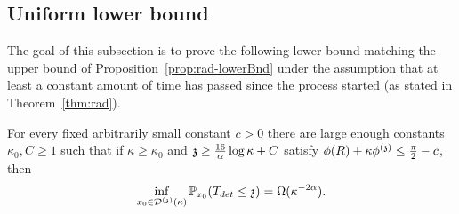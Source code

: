 \subsection{Uniform lower bound}\label{sec:lower_rad}
%
The goal of this subsection is to prove the following lower bound matching the upper bound of Proposition~\ref{prop:rad-lowerBnd}  under the assumption that at least a constant amount of time has passed since the process started (as stated in Theorem~\ref{thm:rad}).
\begin{proposition}\label{prop:rad-upperBnd}
For every fixed arbitrarily small constant $c>0$
there are large enough  constants $\kappa_0, C\geq 1$ such that 
if $\kappa\geq\kappa_0$ and $\ss\geq\frac{16}{\alpha}\log\kappa+C$ satisfy $\phi(R)+\kappa\phi^{(\ss)}\leq\frac{\pi}{2}-c$, then 
\[
\inf_{x_0\in\dt(\kappa)}\P_{x_0}(T_{det}\leq \ss) = \Omega(\kappa^{-2\alpha}).
\]
\end{proposition}
